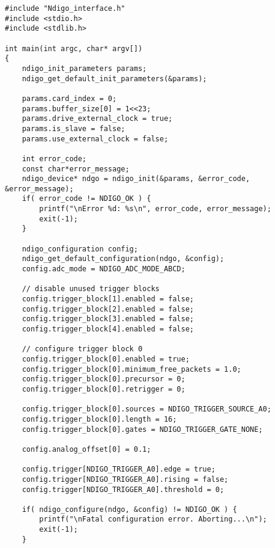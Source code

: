 \begin{lstlisting}[frame=tlrb]
#include "Ndigo_interface.h"
#include <stdio.h>
#include <stdlib.h>

int main(int argc, char* argv[])
{
	ndigo_init_parameters params;
	ndigo_get_default_init_parameters(&params);
	
	params.card_index = 0;
	params.buffer_size[0] = 1<<23;
	params.drive_external_clock = true;
	params.is_slave = false;
	params.use_external_clock = false;
	
	int error_code;
	const char*error_message;
	ndigo_device* ndgo = ndigo_init(&params, &error_code, &error_message);
	if( error_code != NDIGO_OK ) {
		printf("\nError %d: %s\n", error_code, error_message);
		exit(-1);
	}

	ndigo_configuration config;
	ndigo_get_default_configuration(ndgo, &config);
	config.adc_mode = NDIGO_ADC_MODE_ABCD;
	
	// disable unused trigger blocks
	config.trigger_block[1].enabled = false;
	config.trigger_block[2].enabled = false;
	config.trigger_block[3].enabled = false;
	config.trigger_block[4].enabled = false;
	
	// configure trigger block 0
	config.trigger_block[0].enabled = true;
	config.trigger_block[0].minimum_free_packets = 1.0;
	config.trigger_block[0].precursor = 0;
	config.trigger_block[0].retrigger = 0;
	
	config.trigger_block[0].sources = NDIGO_TRIGGER_SOURCE_A0;
	config.trigger_block[0].length = 16;
	config.trigger_block[0].gates = NDIGO_TRIGGER_GATE_NONE;
	
	config.analog_offset[0] = 0.1;
	
	config.trigger[NDIGO_TRIGGER_A0].edge = true;
	config.trigger[NDIGO_TRIGGER_A0].rising = false;
	config.trigger[NDIGO_TRIGGER_A0].threshold = 0;

	if( ndigo_configure(ndgo, &config) != NDIGO_OK ) {
		printf("\nFatal configuration error. Aborting...\n");
		exit(-1);
	}
	

\end{lstlisting}
